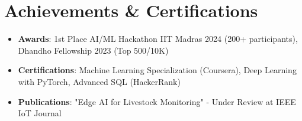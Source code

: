 \documentclass[letterpaper,10.8pt]{article}
\newcommand{\resumeItem}[1]{
  \item\small{#1}
}
\newcommand{\resumeItemListStart}{\begin{itemize}[leftmargin=*,itemsep=2pt,parsep=0pt,topsep=1pt]}
\newcommand{\resumeItemListEnd}{\end{itemize}\vspace{0pt}}
\begin{document}
\section{Achievements \& Certifications}
\resumeItemListStart
    \resumeItem{\textbf{Awards}: 1st Place AI/ML Hackathon IIT Madras 2024 (200+ participants), Dhandho Fellowship 2023 (Top 500/10K)}
    \resumeItem{\textbf{Certifications}: Machine Learning Specialization (Coursera), Deep Learning with PyTorch, Advanced SQL (HackerRank)}
    \resumeItem{\textbf{Publications}: "Edge AI for Livestock Monitoring" - Under Review at IEEE IoT Journal}
\resumeItemListEnd
\end{document}
